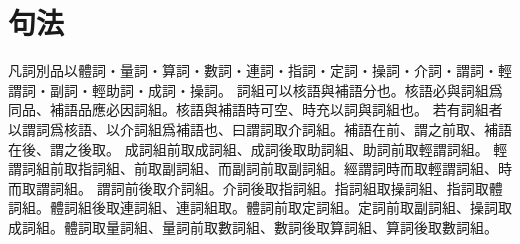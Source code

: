 \chapter*{句法}
凡詞別品以體詞・量詞・算詞・數詞・連詞・指詞・定詞・操詞・介詞・謂詞・輕謂詞・副詞・輕助詞・成詞・操詞。
詞組可以核語與補語分也。核語必與詞組爲同品、補語品應必因詞組。核語與補語時可空、時充以詞與詞組也。
若有詞組者以謂詞爲核語、以介詞組爲補語也、曰謂詞取介詞組。補語在前、謂之前取、補語在後、謂之後取。
成詞組前取成詞組、成詞後取助詞組、助詞前取輕謂詞組。
輕謂詞組前取指詞組、前取副詞組、而副詞前取副詞組。經謂詞時而取輕謂詞組、時而取謂詞組。
謂詞前後取介詞組。介詞後取指詞組。指詞組取操詞組、指詞取體詞組。體詞組後取連詞組、連詞組取。體詞前取定詞組。定詞前取副詞組、操詞取成詞組。體詞取量詞組、量詞前取數詞組、數詞後取算詞組、算詞後取數詞組。
